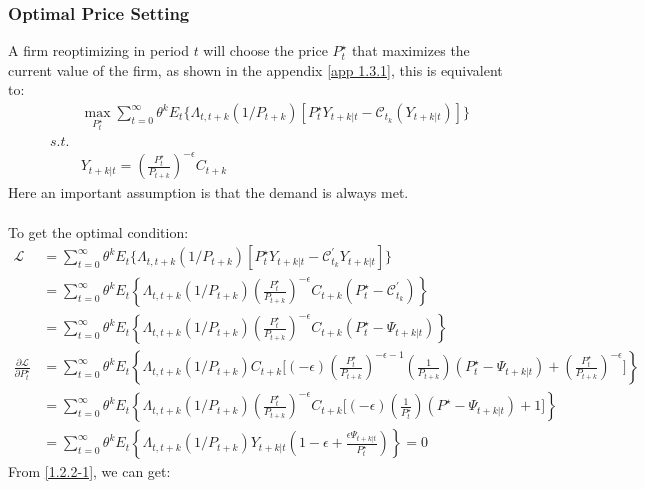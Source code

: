 \documentclass{article}
\numberwithin{equation}{section}
\begin{document}
\subsubsection{Optimal Price Setting}
A firm reoptimizing in period $t$ will choose the price $P^\star_t$ that maximizes the current value of the firm, as shown in the appendix \eqref{app 1.3.1}, this is equivalent to:
	\begin{align*}
		&\mathop{max}\limits_{P^\star_t} \sum\limits^\infty_{t=0} \theta^k E_t\{\Lambda_{t,t+k} (1/P_{t+k}) [P^\star_t Y_{t+k|t} - \mathscr{C}_{t_k}(Y_{t+k|t})]\}\\
		s.t.&\\
		&Y_{t+k|t} = \left(\frac{P^\star_t}{P_{t+k}}\right)^{-\epsilon} C_{t+k}
	\end{align*}
Here an important assumption is that the demand is always met.\\\\
To get the optimal condition:
	\begin{align}
		\mathscr{L} &= \sum\limits^\infty_{t=0} \theta^k E_t\{\Lambda_{t,t+k} (1/P_{t+k}) [P^\star_t Y_{t+k|t} - \mathscr{C}^\prime_{t_k} Y_{t+k|t} ]\} \nonumber\\
		&= \sum\limits^\infty_{t=0} \theta^k E_t\left\{\Lambda_{t,t+k} (1/P_{t+k}) \left(\frac{P^\star_t}{P_{t+k}}\right)^{-\epsilon} C_{t+k} (P^\star_t - \mathscr{C}^\prime_{t_k})\right\} \nonumber\\
		&= \sum\limits^\infty_{t=0} \theta^k E_t\left\{\Lambda_{t,t+k} (1/P_{t+k}) \left(\frac{P^\star_t}{P_{t+k}}\right)^{-\epsilon} C_{t+k} (P^\star_t - \Psi_{t+k|t})\right\} \nonumber\\
		\frac{\partial \mathscr{L}}{\partial P^\star_t} &= \sum\limits^\infty_{t=0} \theta^k E_t\left\{\Lambda_{t,t+k} (1/P_{t+k}) C_{t+k}\bigg[(-\epsilon) \left(\frac{P^\star_t}{P_{t+k}}\right)^{-\epsilon-1} (\frac{1}{P_{t+k}}) (P^\star_t - \Psi_{t+k|t}) + \left(\frac{P^\star_t}{P_{t+k}}\right)^{-\epsilon}\bigg]\right\} \nonumber\\
		&= \sum\limits^\infty_{t=0} \theta^k E_t\left\{\Lambda_{t,t+k} (1/P_{t+k}) \left(\frac{P^\star_t}{P_{t+k}}\right)^{-\epsilon}C_{t+k} \bigg[(-\epsilon) (\frac{1}{P^\star_t}) (P^\star - \Psi_{t+k|t}) + 1 \bigg]\right\} \nonumber\\
		&= \sum\limits^\infty_{t=0} \theta^k E_t\left\{\Lambda_{t,t+k} (1/P_{t+k}) Y_{t+k|t} \left(1 - \epsilon + \frac{\epsilon \Psi_{t+k|t}}{P^\star_t}\right)\right\} = 0 \label{1.2.2-1}
	\end{align}
From \eqref{1.2.2-1}, we can get:
\end{document}
